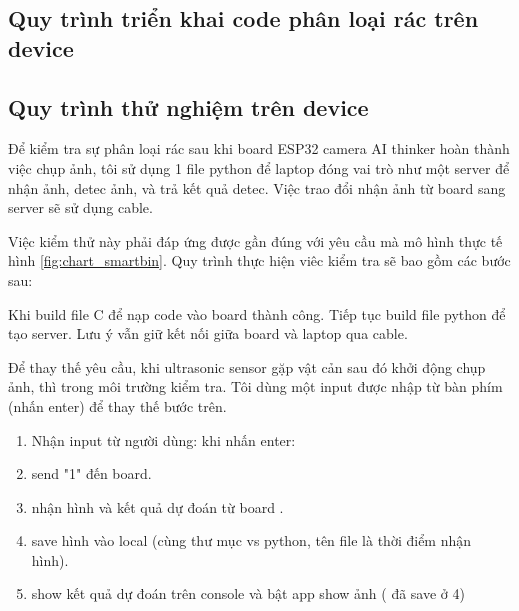 \subsection{Quy trình triển khai code phân loại rác trên device}
\subsection{Quy trình thử nghiệm trên device}
Để kiểm tra sự phân loại rác sau khi board ESP32 camera AI thinker hoàn thành việc chụp ảnh, tôi sử dụng 1 file python để laptop đóng vai trò như một server để nhận ảnh, detec ảnh, và trả kết quả detec. Việc trao đổi nhận ảnh từ board sang server sẽ sử dụng cable. 

Việc kiểm thử này phải đáp ứng được gần đúng với yêu cầu mà mô hình thực tế hình \ref{fig:chart_smartbin}. Quy trình thực hiện viêc kiểm tra sẽ bao gồm các bước sau:

Khi build file C để nạp code vào board thành công. Tiếp tục build file python để tạo server. Lưu ý vẫn giữ kết nối giữa board và laptop qua cable.

Để thay thế yêu cầu, khi ultrasonic sensor gặp vật cản sau đó khởi động chụp ảnh, thì trong môi trường kiểm tra. Tôi dùng một input được nhập từ bàn phím (nhấn enter) để thay thế bước trên. 
\begin{enumerate}
    \item Nhận input từ người dùng: khi nhấn enter: 
    \item send "1" đến  board.
    \item nhận hình và kết quả dự đoán từ board .
    \item save hình vào local (cùng thư mục vs python, tên file là thời điểm nhận hình).
    \item show kết quả dự đoán trên console và bật app show ảnh ( đã save ở 4)
\end{enumerate}

